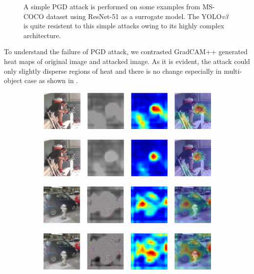 \documentclass[letterpaper]{article}
\begin{document}
\begin{figure}[h]
\begin{subfigure}{\textwidth}
    \end{subfigure}
    \caption{A simple PGD attack is performed on some examples from MS-COCO dataset using ResNet-51 as a surrogate model. The YOLO\emph{v3} is quite resistent to this simple attacks owing to its highly complex architecture.}
    \label{fig:PGD-on-MS-COCO}
\end{figure}
To understand the failure of PGD attack, we contrasted GradCAM++ generated heat maps of original image and attacked image. As it is evident, the attack could only slightly disperse regions of heat and there is no change especially in multi-object case as shown in .\\
\begin{figure}[h]
    \begin{subfigure}{\textwidth}
        \includegraphics[width = \textwidth, height = 0.15\textwidth]{Images/HeatMapsPGD/out_test1.jpg}
    \end{subfigure}
    \begin{subfigure}{\textwidth}
        \includegraphics[width = \textwidth, height = 0.15\textwidth]{Images/HeatMapsPGD/out_att_test1.jpg}
    \end{subfigure}
    \begin{subfigure}{\textwidth}
        \includegraphics[width = \textwidth, height = 0.15\textwidth]{Images/HeatMapsPGD/out_test2.jpg}
     \end{subfigure}
    \begin{subfigure}{\textwidth}
        \includegraphics[width = \textwidth, height = 0.15\textwidth]{Images/HeatMapsPGD/out_att_test2.jpg}

\end{subfigure}
\end{figure}
\end{document}
